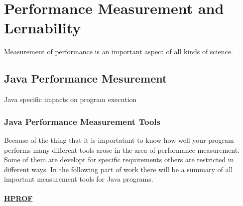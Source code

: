 \chapter{Performance Measurement and Lernability}
\label{chap:p_measurement}

 Measurement of performance is an important aspect of all kinds of science. 


\section{Java Performance Mesurement}
\label{perf_measure}

Java specific impacts on program execution 

\subsection{Java Performance Measurement Tools}

Because of the thing that it is importatant to know how well your program performs many different tools arose in the area of performance measurement. Some of them are developt for specific requirements others are restricted in different ways. In the following part of work there will be a summary of all important measurement tools for Java programs.


\subsubsection{\href{https://profiler.netbeans.org/}{HPROF}}


